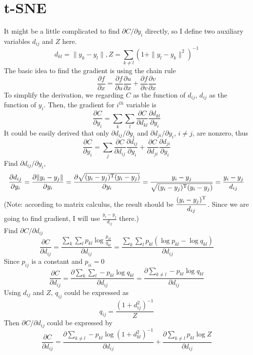 \documentclass[11pt]{article}
\begin{document}
\section{t-SNE}
It might be a little complicated to find $\partial{C}/\partial{y_i}$ directly, 
so I define two auxiliary variables $d_{ij}$ and $Z$ here. \cite{maaten2008visualizing}
$$
    d_{kl} = \|y_k - y_l\|, Z = \sum_{k\neq l} (1+\|y_l - y_k\|^2)^{-1}
$$
The basic idea to find the gradient is using the chain rule
$$
\frac{\partial{f}}{\partial{x}} = \frac{\partial{f}}{\partial{u}}\frac{\partial{u}}{\partial{x}} + 
\frac{\partial{f}}{\partial{v}}\frac{\partial{v}}{\partial{x}}
$$
To simplify the derivation, we regarding $C$ as the function of $d_{ij}$, $d_{ij}$ as the function of $y_i$. 
Then, the gradient for $i^{th}$ variable is
$$
\frac{\partial{C}}{\partial{y_i}} = \sum_{k}\sum_{l} \frac{\partial{C}}{\partial{d_{kl}}}
\frac{\partial{d_{kl}}}{\partial{y_i}}
$$
It could be easily derived that only $\partial d_{ij}/\partial y_i$ and $\partial d_{ji}/\partial y_i$, $i\neq j$, 
are nonzero, thus
$$
\frac{\partial{C}}{\partial{y_i}} = \sum_j \frac{\partial{C}}{\partial{d_{ij}}}
\frac{\partial{d_{ij}}}{\partial{y_i}} +\frac{\partial{C}}{\partial{d_{ji}}}
\frac{\partial{d_{ji}}}{\partial{y_i}}
$$
Find $\partial{d_{ij}}/\partial{y_i}$, 
$$
\frac{\partial{d_{ij}}}{\partial{y_i}} = \frac{\partial{\|y_i - y_j\|}}{\partial{y_i}} = 
\frac{\partial\sqrt{(y_i-y_j)^{\rm T}(y_i-y_j)}}{\partial{y_i}} = \frac{y_i-y_j}
{\sqrt{(y_i-y_j)^{\rm T}(y_i-y_j)}} = \frac{y_i-y_j}{d_{ij}}
$$
(Note: according to matrix calculus, the result should be $\displaystyle\frac{(y_i-y_j)^{\rm T}}{d_{ij}}$.
Since we are going to find gradient, I will use $\displaystyle\frac{y_i-y_j}{d_{ij}}$ there.) \\
Find $\partial C/\partial d_{ij}$
$$
\frac{\partial C}{\partial d_{ij}} = \frac{\sum_k \sum_l p_{kl} \log\frac{p_{kl}}{q_{kl}}}
{\partial d_{ij}} = \frac{\sum_k\sum_l p_{kl}(\log p_{kl} - \log q_{kl})}{\partial d_{ij}}
$$
Since $p_{ij}$ is a constant and $p_{ii}=0$
$$
\frac{\partial C}{\partial d_{ij}} = \frac{\partial{\sum_k\sum_l -p_{kl}\log q_{kl}}}{\partial d_{ij}} = 
\frac{\partial\sum_{k\neq l}-p_{kl}\log q_{kl}}{\partial d_{ij}}
$$
Using $d_{ij}$ and $Z$, $q_{ij}$ could be expressed as
$$
    q_{ij} = \frac{(1+d_{ij}^2)^{-1}}{Z}
$$
Then $\partial C/\partial d_{ij}$ could be expressed by
$$
\frac{\partial C}{\partial d_{ij}} = \frac{\partial \sum_{k\neq l}-p_{kl}\log(1+d_{kl}^2)^{-1}}{\partial d_{ij}} + 
\frac{\partial \sum_{k\neq l} p_{kl}\log Z}{\partial d_{ij}}
$$
\end{document}
